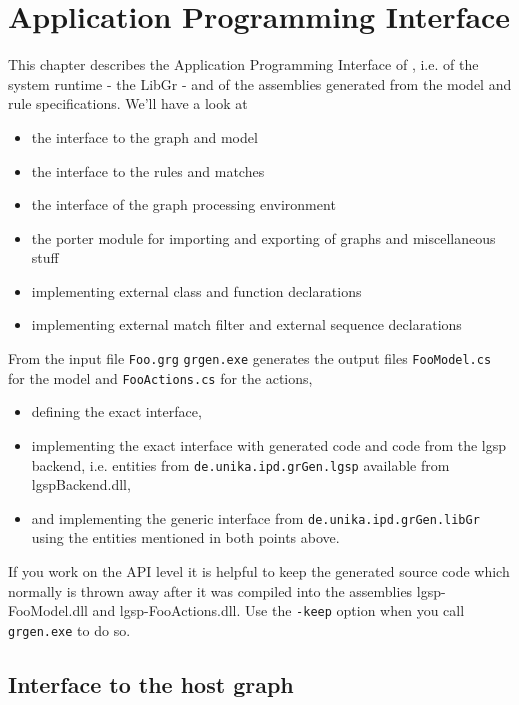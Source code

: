 \chapter{Application Programming Interface} 
\label{cha:api}

This chapter describes the Application Programming Interface of \GrG, i.e. of the system runtime - the LibGr - and of the assemblies generated from the model and rule specifications.
We'll have a look at
\begin{itemize}
\item the interface to the graph and model
\item the interface to the rules and matches
\item the interface of the graph processing environment
\item the porter module for importing and exporting of graphs and miscellaneous stuff
\item implementing external class and function declarations
\item implementing external match filter and external sequence declarations
\end{itemize}

\noindent From the input file \texttt{Foo.grg} \texttt{grgen.exe} generates the output files \texttt{FooModel.cs} for the model and \texttt{FooActions.cs} for the actions,
\begin{itemize}
\item defining the exact interface, 
\item implementing the exact interface with generated code and code from the lgsp backend, i.e. entities from \texttt{de.unika.ipd.grGen.lgsp} available from lgspBackend.dll, 
\item and implementing the generic interface from \texttt{de.unika.ipd.grGen.libGr} using the entities mentioned in both points above.
\end{itemize}

\begin{note}
If you work on the API level it is helpful to keep the generated source code which normally is thrown away 
after it was compiled into the assemblies lgsp-FooModel.dll and lgsp-FooActions.dll.
Use the \texttt{-keep} option when you call \texttt{grgen.exe} to do so.
\end{note}


\section{Interface to the host graph}

